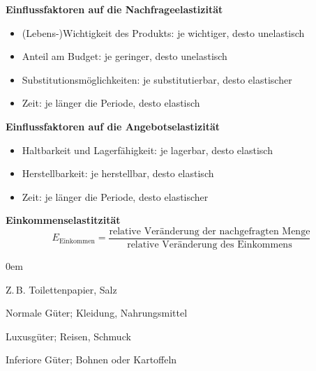 \textbf{Einflussfaktoren auf die Nachfrageelastizität}
\begin{itemize}\itemsep0em
	\item (Lebens-)Wichtigkeit des Produkts: je wichtiger, desto unelastisch
	\item Anteil am Budget: je geringer, desto unelastisch
	\item Substitutionsmöglichkeiten: je substitutierbar, desto elastischer
	\item Zeit: je länger die Periode, desto elastisch
\end{itemize}


\textbf{Einflussfaktoren auf die Angebotselastizität}
\begin{itemize}\itemsep0em
	\item Haltbarkeit und Lagerfähigkeit: je lagerbar, desto elastisch
	\item Herstellbarkeit: je herstellbar, desto elastisch
	\item Zeit: je länger die Periode, desto elastischer
\end{itemize}

\textbf{Einkommenselastitzität}
\begin{equation*}
	E_{\mbox{Einkommen}} = \frac{\mbox{relative Veränderung der nachgefragten Menge}}{\mbox{relative Veränderung des Einkommens}}
\end{equation*}

\begin{description}\itemsep0em
	\item [vollkommen unelastisch ($E = 0$)] Z.\,B. Toilettenpapier, Salz
	\item [unelastisch ($0 < E < 1$)] Normale Güter; Kleidung, Nahrungsmittel
	\item [elastisch ($E > 1$)] Luxusgüter; Reisen, Schmuck
	\item [anomal elastisch ($E < 0$)] Inferiore Güter; Bohnen oder Kartoffeln
\end{description}

